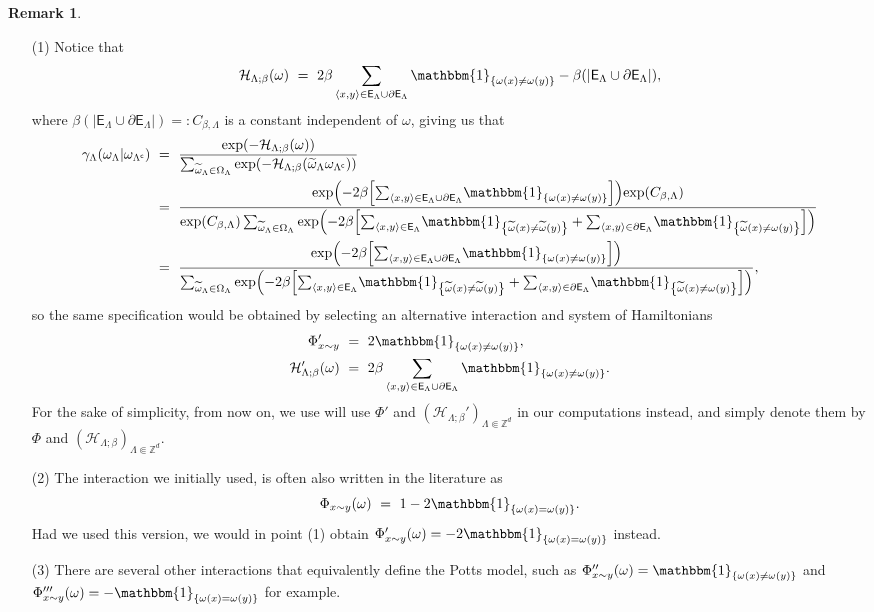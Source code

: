 \documentclass[12pt]{article}
\newcommand{\E}{\mathsf{E}}
\renewcommand{\H}{\mathcal{H}}
\newcommand{\Z}{\mathbb{Z}}
\newcommand{\set}[1]{\left\{#1\right\}}
\newcommand{\oklepaj}[1]{\left(#1\right)}
\newcommand{\oglati}[1]{\left[#1\right]}
\newcommand{\1}{\mathbbm{1}}
\renewcommand{\sp}[1]{\langle #1\rangle}
\renewcommand{\c}{\mathsf{c}}
\newcommand{\5}{\vspace{0.5cm}}
\renewcommand{\tilde}{\widetilde}
\theoremstyle{definition}
\newtheorem{rem}[thm]{Remark}
\begin{document}
\begin{rem}\label{HamiltEquiv}
\begin{itemize}
	\item[(1)] Notice that $$\H_{\Lambda;\beta}(\omega) ~=~ 2\beta\sum_{\sp{x,y}\in\E_\Lambda\cup\partial\E_\Lambda}\1_{\set{\omega(x)\neq\omega(y)}} -\beta(|\E_\Lambda\cup\partial\E_\Lambda|),$$
	where $\beta(|\E_\Lambda\cup\partial\E_\Lambda|)=:C_{\beta,\Lambda}$ is a constant independent of $\omega$, giving us that
	\begin{align*}
	\gamma_{\Lambda}(\omega_{\Lambda}|\omega_{\Lambda^\c}) ~&=~ \frac{\exp(-\H_{\Lambda;\beta}(\omega))}{\sum_{\tilde{\omega}_{\Lambda}\in\Omega_{\Lambda}}\exp(-\H_{\Lambda;\beta}(\tilde{\omega}_{\Lambda}\omega_{\Lambda^\c}))} \\
	&=~ \frac{\exp\!\oklepaj{-2\beta\!\oglati{\sum_{\sp{x,y}\in\E_\Lambda\cup\partial\E_\Lambda}\!\1_{\set{\omega(x)\neq\omega(y)}}}}\!\exp(C_{\beta,\Lambda})}{\exp(C_{\beta,\Lambda})\sum_{\tilde{\omega}_{\Lambda}\in\Omega_{\Lambda}}\exp\!\oklepaj{-2\beta\!\oglati{\sum_{\sp{x,y}\in\E_\Lambda}\!\1_{\set{\tilde{\omega}(x)\neq\tilde{\omega}(y)}} + \sum_{\sp{x,y}\in\partial\E_\Lambda}\!\1_{\set{\tilde{\omega}(x)\neq\omega(y)}}}}} \\
	&=~ \frac{\exp\!\oklepaj{-2\beta\!\oglati{\sum_{\sp{x,y}\in\E_\Lambda\cup\partial\E_\Lambda}\!\1_{\set{\omega(x)\neq\omega(y)}}}}}{\sum_{\tilde{\omega}_{\Lambda}\in\Omega_{\Lambda}}\exp\!\oklepaj{-2\beta\!\oglati{\sum_{\sp{x,y}\in\E_{\Lambda}}\!\1_{\set{\tilde{\omega}(x)\neq\tilde{\omega}(y)}} + \sum_{\sp{x,y}\in\partial\E_{\Lambda}}\!\1_{\set{\tilde{\omega}(x)\neq\omega(y)}}}}},
	\end{align*}
	so the same specification would be obtained by selecting an alternative interaction and system of Hamiltonians
	\begin{align*}
	\Phi_{x\sim y}' ~&=~ 2\1_{\set{\omega(x)\neq\omega(y)}}, \\
	\H_{\Lambda;\beta}'(\omega) ~&=~ 2\beta\sum_{\sp{x,y}\in\E_{\Lambda}\cup\partial\E_\Lambda}\1_{\set{\omega(x)\neq\omega(y)}}.
	\end{align*}
	For the sake of simplicity, from now on, we use will use $\Phi'$ and $(\H_{\Lambda;\beta}')_{\Lambda\Subset\Z^d}$ in our computations instead, and simply denote them by $\Phi$ and $(\H_{\Lambda;\beta})_{\Lambda\Subset\Z^d}$.
	\item[(2)] The interaction we initially used, is often also written in the literature as 
	$$\Phi_{x\sim y}(\omega) ~=~ 1-2\1_{\set{\omega(x)=\omega(y)}}.$$
	Had we used this version, we would in point (1) obtain $\Phi_{x\sim y}'(\omega)=-2\1_{\set{\omega(x)=\omega(y)}}$ instead.
	\item[(3)] There are several other interactions that equivalently define the Potts model, such as $\Phi_{x\sim y}''(\omega)=\1_{\set{\omega(x)\neq\omega(y)}}$ and $\Phi_{x\sim y}'''(\omega)=-\1_{\set{\omega(x)=\omega(y)}}$ for example.
\end{itemize}
\end{rem}
\end{document}
